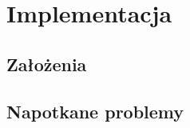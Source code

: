 \chapter{Implementacja} \label{chap:implementacja}

\section{Założenia}

\section{Napotkane problemy}